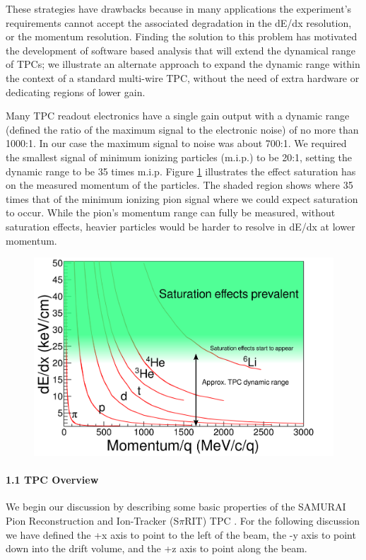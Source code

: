 \documentclass[review]{elsarticle}
\begin{document}
 These strategies have drawbacks because in many applications the experiment's requirements cannot accept the associated degradation in the dE/dx
resolution, or the momentum resolution. Finding the solution to this problem has motivated the development of software based analysis that will extend the dynamical range of TPCs; we illustrate an alternate approach to expand the dynamic range within the context of a standard multi-wire TPC, without the need of extra hardware or dedicating regions of lower gain. 
 
 Many TPC readout electronics have a single gain output with a dynamic range (defined the ratio of the maximum signal to the electronic noise) of no more than 1000:1. In our case the maximum signal to noise was about 700:1. We required the smallest signal of minimum ionizing particles (m.i.p.) to be 20:1, setting the dynamic range to be 35 times m.i.p. Figure \ref{fig:intro} illustrates the effect saturation has on the measured momentum of the particles. The shaded region shows where 35 times that of the minimum ionizing pion signal where we could expect saturation to occur. While the pion's momentum range can fully be measured, without saturation effects, heavier particles would be harder to resolve in dE/dx at lower momentum.

 
 
\begin{figure}[H]
\includegraphics[width=\linewidth]{intrographic}
\caption{}
\label{fig:intro}
\end{figure}

\paragraph{1.1 TPC Overview}
We begin our discussion by describing some basic properties of the SAMURAI Pion Reconstruction and Ion-Tracker (S$\pi$RIT) TPC \citep{shane}. For the following discussion we have defined the +x axis to point to the left of the beam, the -y axis to point down into the drift volume, and the +z axis to point along the beam. 
\end{document}
